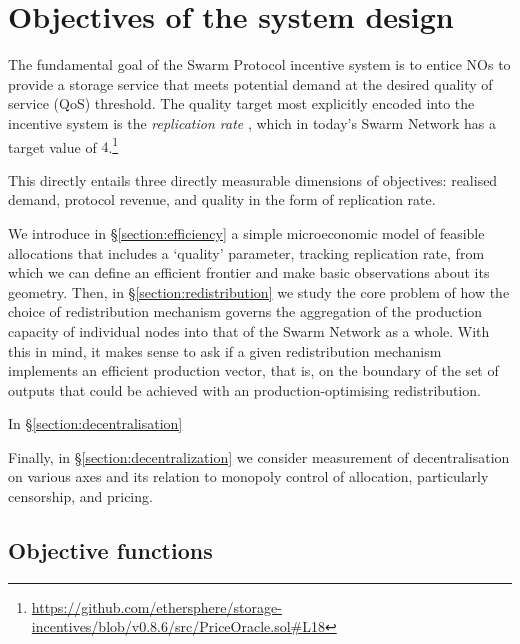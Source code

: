 \newpage

\section{Objectives of the system design}
\label{section:objectives}

The fundamental goal of the Swarm Protocol incentive system is to entice NOs to provide a storage service that meets potential demand at the desired quality of service (QoS) threshold.
%
The quality target most explicitly encoded into the incentive system is the \emph{replication rate} \cite[\S3.4.5]{book-of-swarm}, which in today's Swarm Network has a target value of $4$.\footnote{\url{https://github.com/ethersphere/storage-incentives/blob/v0.8.6/src/PriceOracle.sol\#L18}}

This directly entails three directly measurable dimensions of objectives: realised demand, protocol revenue, and quality in the form of replication rate.

We introduce in \S\ref{section:efficiency} a simple microeconomic model of feasible allocations that includes a `quality' parameter, tracking replication rate, from which we can define an efficient frontier and make basic observations about its geometry.
%
Then, in \S\ref{section:redistribution} we study the core problem of how the choice of redistribution mechanism governs the aggregation of the production capacity of individual nodes into that of the Swarm Network as a whole.
%
With this in mind, it makes sense to ask if a given redistribution mechanism implements an efficient production vector, that is, on the boundary of the set of outputs that could be achieved with an production-optimising redistribution.

In \S\ref{section:decentralisation}


Finally, in \S\ref{section:decentralization} we consider measurement of decentralisation on various axes and its relation to monopoly control of allocation, particularly censorship, and pricing.

\subsection{Objective functions}

